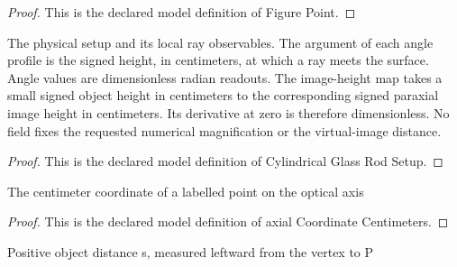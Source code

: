 \begin{proof}
  This is the declared model definition of Figure Point.
\end{proof}
\begin{definition}
  \label{def:physics:phyx-mini-0041:phyxminiproblems-problemphyxmini0041-cylindricalglassrodsetup}
  The physical setup and its local ray observables. The argument of each angle profile is the signed height, in centimeters, at which a ray meets the surface. Angle values are dimensionless radian readouts. The image-height map takes a small signed object height in centimeters to the corresponding signed paraxial image height in centimeters. Its derivative at zero is therefore dimensionless. No field fixes the requested numerical magnification or the virtual-image distance.
\end{definition}
\begin{proof}
  This is the declared model definition of Cylindrical Glass Rod Setup.
\end{proof}
\begin{definition}
  \label{def:physics:phyx-mini-0041:phyxminiproblems-problemphyxmini0041-axialcoordinatecentimeters}
  The centimeter coordinate of a labelled point on the optical axis
\end{definition}
\begin{proof}
  This is the declared model definition of axial Coordinate Centimeters.
\end{proof}
\begin{definition}
  \label{def:physics:phyx-mini-0041:phyxminiproblems-problemphyxmini0041-objectdistancecentimeters}
  Positive object distance s, measured leftward from the vertex to P
\end{definition}
